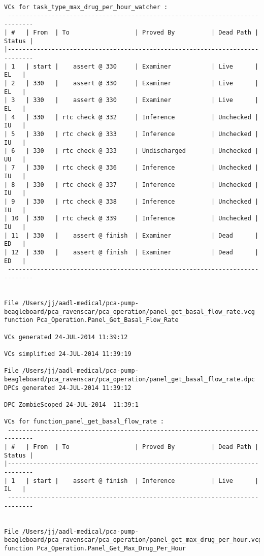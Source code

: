 \begin{lstlisting}[frame=single, gobble=0, caption={POGS report for PCA Pump prototype}]
VCs for task_type_max_drug_per_hour_watcher :
 -----------------------------------------------------------------------------
| #   | From  | To                  | Proved By          | Dead Path | Status |
|-----------------------------------------------------------------------------
| 1   | start |    assert @ 330     | Examiner           | Live      |   EL   |
| 2   | 330   |    assert @ 330     | Examiner           | Live      |   EL   |
| 3   | 330   |    assert @ 330     | Examiner           | Live      |   EL   |
| 4   | 330   | rtc check @ 332     | Inference          | Unchecked |   IU   |
| 5   | 330   | rtc check @ 333     | Inference          | Unchecked |   IU   |
| 6   | 330   | rtc check @ 333     | Undischarged       | Unchecked |   UU   |
| 7   | 330   | rtc check @ 336     | Inference          | Unchecked |   IU   |
| 8   | 330   | rtc check @ 337     | Inference          | Unchecked |   IU   |
| 9   | 330   | rtc check @ 338     | Inference          | Unchecked |   IU   |
| 10  | 330   | rtc check @ 339     | Inference          | Unchecked |   IU   |
| 11  | 330   |    assert @ finish  | Examiner           | Dead      |   ED   |
| 12  | 330   |    assert @ finish  | Examiner           | Dead      |   ED   |
 -----------------------------------------------------------------------------


File /Users/jj/aadl-medical/pca-pump-beagleboard/pca_ravenscar/pca_operation/panel_get_basal_flow_rate.vcg
function Pca_Operation.Panel_Get_Basal_Flow_Rate

VCs generated 24-JUL-2014 11:39:12

VCs simplified 24-JUL-2014 11:39:19

File /Users/jj/aadl-medical/pca-pump-beagleboard/pca_ravenscar/pca_operation/panel_get_basal_flow_rate.dpc
DPCs generated 24-JUL-2014 11:39:12

DPC ZombieScoped 24-JUL-2014  11:39:1

VCs for function_panel_get_basal_flow_rate :
 -----------------------------------------------------------------------------
| #   | From  | To                  | Proved By          | Dead Path | Status |
|-----------------------------------------------------------------------------
| 1   | start |    assert @ finish  | Inference          | Live      |   IL   |
 -----------------------------------------------------------------------------


File /Users/jj/aadl-medical/pca-pump-beagleboard/pca_ravenscar/pca_operation/panel_get_max_drug_per_hour.vcg
function Pca_Operation.Panel_Get_Max_Drug_Per_Hour


\end{lstlisting}
